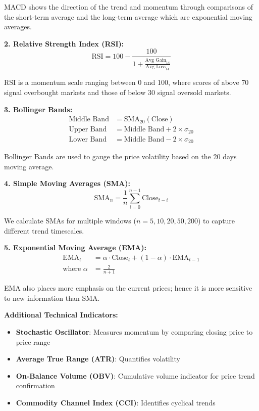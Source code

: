 \documentclass[12pt,a4paper]{article}
\begin{document}
MACD shows the direction of the trend and momentum through comparisons of the short-term average and the long-term average which are exponential moving averages.

\textbf{2. Relative Strength Index (RSI):}
\begin{equation}
\text{RSI} = 100 - \frac{100}{1 + \frac{\text{Avg Gain}_{14}}{\text{Avg Loss}_{14}}}
\end{equation}

RSI is a momentum scale ranging between 0 and 100, where scores of above 70 signal overbought markets and those of below 30 signal oversold markets.

\textbf{3. Bollinger Bands:}
\begin{align}
\text{Middle Band} &= \text{SMA}_{20}(\text{Close}) \\
\text{Upper Band} &= \text{Middle Band} + 2 \times \sigma_{20} \\
\text{Lower Band} &= \text{Middle Band} - 2 \times \sigma_{20}
\end{align}

Bollinger Bands are used to gauge the price volatility based on the 20 days moving average.

\textbf{4. Simple Moving Averages (SMA):}
\begin{equation}
\text{SMA}_n = \frac{1}{n} \sum_{i=0}^{n-1} \text{Close}_{t-i}
\end{equation}

We calculate SMAs for multiple windows ($n = 5, 10, 20, 50, 200$) to capture different trend timescales.

\textbf{5. Exponential Moving Average (EMA):}
\begin{align}
\text{EMA}_t &= \alpha \cdot \text{Close}_t + (1-\alpha) \cdot \text{EMA}_{t-1} \\
\text{where } \alpha &= \frac{2}{n+1}
\end{align}

EMA also places more emphasis on the current prices; hence it is more sensitive to new information than SMA.

\textbf{Additional Technical Indicators:}
\begin{itemize}
    \item \textbf{Stochastic Oscillator}: Measures momentum by comparing closing price to price range
    \item \textbf{Average True Range (ATR)}: Quantifies volatility
    \item \textbf{On-Balance Volume (OBV)}: Cumulative volume indicator for price trend confirmation
    \item \textbf{Commodity Channel Index (CCI)}: Identifies cyclical trends
\end{itemize}
\end{document}
